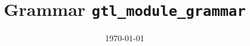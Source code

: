 \documentclass[landscape]{book}
\begin{document}
\title{\Huge{Grammar \texttt{gtl\_module\_grammar}}}
\date \today 

\maketitle


\end{document}
